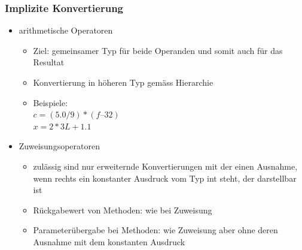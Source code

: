 \documentclass[a4paper,10pt]{article}
\begin{document}
\subsubsection{Implizite Konvertierung}
\begin{itemize}
	\item arithmetische Operatoren
		\begin{itemize}
			\item Ziel: gemeinsamer Typ f\"ur beide Operanden und somit auch f\"ur das Resultat
			\item Konvertierung in h\"oheren Typ gem\"ass Hierarchie
			\item Beispiele: \\ $c = (5.0/9)*(f – 32)$ \\ $x = 2*3L + 1.1$
		\end{itemize}
	\item Zuweisungsoperatoren
		\begin{itemize}
			\item zul\"assig sind nur erweiternde Konvertierungen mit der einen Ausnahme, wenn rechts ein konstanter Ausdruck vom Typ int steht, der darstellbar ist
			\item R\"uckgabewert von Methoden: wie bei Zuweisung
			\item Parameter\"ubergabe bei Methoden: wie Zuweisung aber ohne deren Ausnahme mit dem konstanten Ausdruck
		\end{itemize}
\end{itemize}
\end{document}
